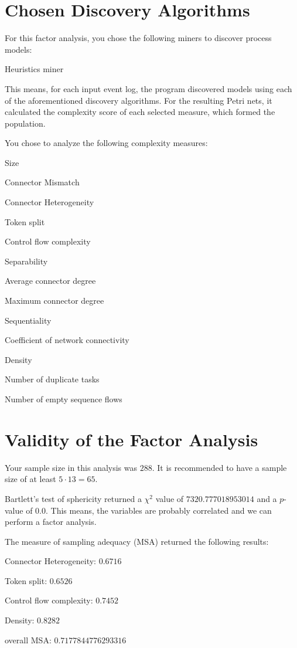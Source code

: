 \documentclass[a4paper]{article}
\begin{document}
\section*{Chosen Discovery Algorithms}
For this factor analysis, you chose the following miners to discover process models:
\begin{compactitem}
\item Heuristics miner
\end{compactitem}

This means, for each input event log, the program discovered models using each of the aforementioned discovery algorithms.
For the resulting Petri nets, it calculated the complexity score of each selected measure, which formed the population.

You chose to analyze the following complexity measures:
\begin{compactitem}
\item Size
\item Connector Mismatch
\item Connector Heterogeneity
\item Token split
\item Control flow complexity
\item Separability
\item Average connector degree
\item Maximum connector degree
\item Sequentiality
\item Coefficient of network connectivity
\item Density
\item Number of duplicate tasks
\item Number of empty sequence flows
\end{compactitem}

\section*{Validity of the Factor Analysis}
Your sample size in this analysis was $288$.
It is recommended to have a sample size of at least $5 \cdot 13 = 65$.

Bartlett's test of sphericity returned a $\chi^2$ value of $7320.777018953014$ and a $p$-value of $0.0$.
This means, the variables are probably correlated and we can perform a factor analysis.

The measure of sampling adequacy (MSA) returned the following results:
\begin{compactitem}
\item Connector Heterogeneity: $0.6716$
\item Token split: $0.6526$
\item Control flow complexity: $0.7452$
\item Density: $0.8282$
\item overall MSA: $0.7177844776293316$
\end{compactitem}
\end{document}

